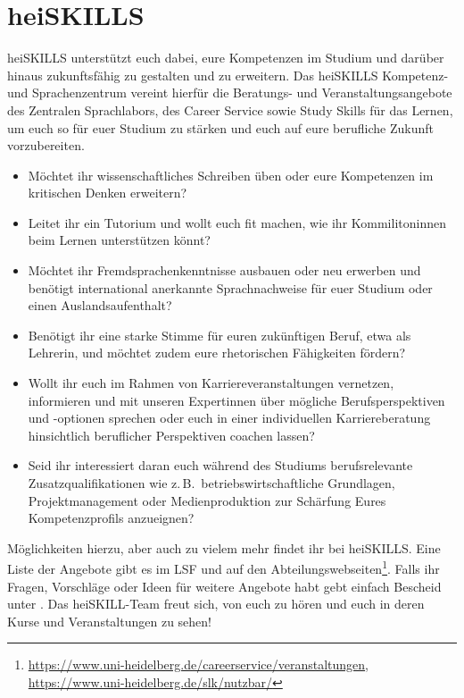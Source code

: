 \section{heiSKILLS}

heiSKILLS unterstützt euch dabei, eure Kompetenzen im Studium und darüber hinaus zukunftsfähig zu gestalten und zu erweitern. Das heiSKILLS Kompetenz- und Sprachenzentrum vereint hierfür die Beratungs- und Veranstaltungsangebote des Zentralen Sprachlabors, des Career Service sowie Study Skills für das Lernen, um euch so für euer Studium zu stärken und euch auf eure berufliche Zukunft vorzubereiten.

\begin{itemize}
  \item Möchtet ihr wissenschaftliches Schreiben üben oder eure Kompetenzen im kritischen Denken erweitern?
  \item Leitet ihr ein Tutorium und wollt euch fit machen, wie ihr Kommilitoninnen beim Lernen unterstützen könnt?
  \item Möchtet ihr Fremdsprachenkenntnisse ausbauen oder neu erwerben und benötigt international anerkannte Sprachnachweise für euer Studium oder einen Auslandsaufenthalt?
  \item Benötigt ihr eine starke Stimme für euren zukünftigen Beruf, etwa als Lehrerin, und möchtet zudem eure rhetorischen Fähigkeiten fördern?
  \item Wollt ihr euch im Rahmen von Karriereveranstaltungen vernetzen, informieren und mit unseren Expertinnen über mögliche Berufsperspektiven und -optionen sprechen oder euch in einer individuellen Karriereberatung hinsichtlich beruflicher Perspektiven coachen lassen?
  \item Seid ihr interessiert daran euch während des Studiums berufsrelevante Zusatzqualifikationen wie z.\,B.\, betriebswirtschaftliche Grundlagen, Projektmanagement oder Medienproduktion zur Schärfung Eures Kompetenzprofils anzueignen?

\end{itemize}

Möglichkeiten hierzu, aber auch zu vielem mehr findet ihr bei heiSKILLS.
Eine Liste der Angebote gibt es im LSF und auf den Abteilungswebseiten\footnote{\url{https://www.uni-heidelberg.de/careerservice/veranstaltungen}, \url{https://www.uni-heidelberg.de/slk/nutzbar/}}.
Falls ihr Fragen, Vorschläge oder Ideen für weitere Angebote habt gebt einfach Bescheid unter . Das heiSKILL-Team freut sich, von euch zu hören und euch in deren Kurse und Veranstaltungen zu sehen!

